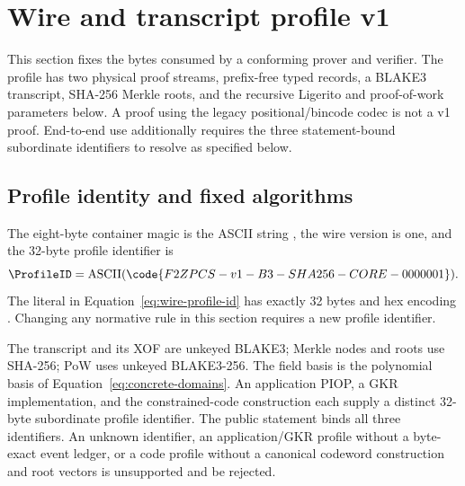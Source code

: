 \section{Wire and transcript profile v1}
\label{sec:wire-profile}

\begingroup\small

\begin{normative}
This section fixes the bytes consumed by a conforming prover and verifier.
The profile has two physical proof streams, prefix-free typed records, a
BLAKE3 transcript, SHA-256 Merkle roots, and the recursive Ligerito and
proof-of-work parameters below.  A proof using the legacy positional/bincode
codec is not a v1 proof.  End-to-end use additionally requires the three
statement-bound subordinate identifiers to resolve as specified below.
\end{normative}

\subsection{Profile identity and fixed algorithms}
\label{sec:wire-profile-id}

The eight-byte container magic is the ASCII string ,
the wire version is one, and the 32-byte profile identifier is
\begin{equation}
 \ProfileID=\operatorname{ASCII}
   (\code{F2ZPCS-v1-B3-SHA256-CORE-0000001}).
 \label{eq:wire-profile-id}
\end{equation}
The literal in Equation~\eqref{eq:wire-profile-id} has exactly 32 bytes and
hex encoding
.
Changing any normative rule in this section requires a new profile identifier.

The transcript and its XOF are unkeyed BLAKE3; Merkle nodes and roots use
SHA-256; PoW uses unkeyed BLAKE3-256.  The field basis is the polynomial basis
of Equation~\eqref{eq:concrete-domains}.  An application PIOP, a GKR
implementation, and the constrained-code construction each supply a distinct
32-byte subordinate profile identifier.  The public statement binds all three
identifiers.  An unknown identifier, an application/GKR profile without a
byte-exact event ledger, or a code profile without a canonical codeword
construction and root vectors is unsupported and \must{} be rejected.

